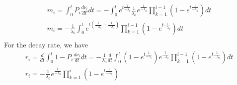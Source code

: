 \documentclass[12pt]{article}
\begin{document}
\begin{equation}
\begin{split}
m_i = \int_0^t P_i\frac{d\nu_i}{dt}dt = -\int_0^t e^{t\frac{1}{-\lambda_i}}\frac{1}{\lambda_0}e^{\frac{t}{-\lambda_0}}\prod_{k=1}^{i-1} (1-e^{t\frac{1}{-\lambda_k}})dt\\
m_i = -\frac{1}{\lambda_0}\int_0^te^{t(\frac{1}{-\lambda_0}+\frac{1}{-\lambda_1})}\prod_{k=1}^{i-1} (1-e^{t\frac{1}{-\lambda_k}})dt \\
\end{split}
\end{equation}
For the decay rate, we have
\begin{equation}
\begin{split}
r_i = \frac{d}{dt}\int_0^t 1-P_i\frac{d\nu_i}{dt}dt = -\frac{1}{\lambda_0}\frac{d}{dt}\int_0^t (1-e^{t\frac{1}{-\lambda_i}})e^{\frac{t}{-\lambda_0}}\prod_{k=1}^{i-1} (1-e^{t\frac{1}{-\lambda_k}})dt\\
r_i =  -\frac{1}{\lambda_0}e^{\frac{t}{-\lambda_0}}\prod_{k=1}^{i} (1-e^{t\frac{1}{-\lambda_k}})\\
\end{split}
\end{equation}
\end{document}
